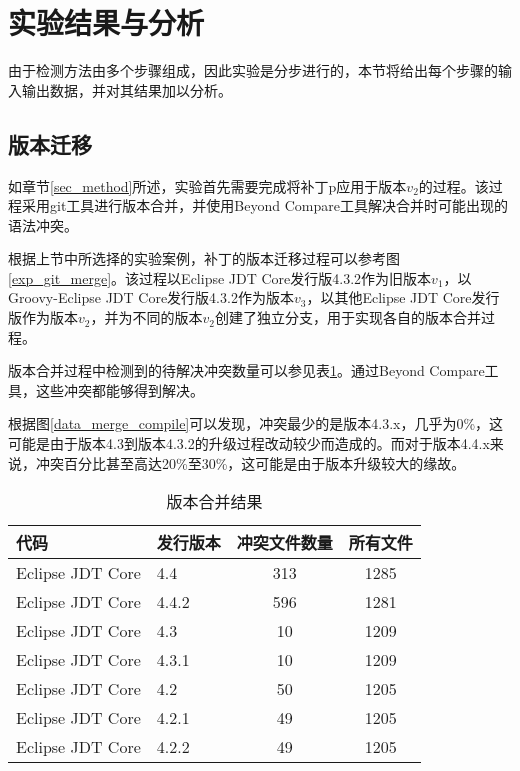 \section{实验结果与分析}
\label {exp_result}

由于检测方法由多个步骤组成，因此实验是分步进行的，本节将给出每个步骤的输入输出数据，并对其结果加以分析。

\subsection{版本迁移}

如章节\ref {sec_method}所述，实验首先需要完成将补丁p应用于版本$v_2$的过程。该过程采用git工具进行版本合并，并使用Beyond Compare工具解决合并时可能出现的语法冲突。

根据上节中所选择的实验案例，补丁的版本迁移过程可以参考图\ref {exp_git_merge}。该过程以Eclipse JDT Core发行版4.3.2作为旧版本$v_1$，以Groovy-Eclipse JDT Core发行版4.3.2作为版本$v_3$，以其他Eclipse JDT Core发行版作为版本$v_2$，并为不同的版本$v_2$创建了独立分支，用于实现各自的版本合并过程。

版本合并过程中检测到的待解决冲突数量可以参见表\ref {data_git_merge}。通过Beyond Compare工具，这些冲突都能够得到解决。

根据图\ref {data_merge_compile}可以发现，冲突最少的是版本4.3.x，几乎为0\%，这可能是由于版本4.3到版本4.3.2的升级过程改动较少而造成的。而对于版本4.4.x来说，冲突百分比甚至高达20\%至30\%，这可能是由于版本升级较大的缘故。




\begin{table}[H]
	\caption{版本合并结果}
	\label{data_git_merge}
	\centering
	\begin{tabular}{llcc}
		\toprule[1.5pt]
		{\heiti 代码} & {\heiti 发行版本} & {\heiti 冲突文件数量} & {\heiti 所有文件}\\\midrule[1pt]
		Eclipse JDT Core & 4.4 & 313 & 1285\\
		Eclipse JDT Core & 4.4.2 & 596 & 1281\\
		Eclipse JDT Core & 4.3 & 10 & 1209\\
		Eclipse JDT Core & 4.3.1 & 10 & 1209\\
		Eclipse JDT Core & 4.2 & 50 & 1205\\
		Eclipse JDT Core & 4.2.1 & 49 & 1205\\
		Eclipse JDT Core & 4.2.2 & 49 & 1205\\
		\bottomrule[1.5pt]
	\end{tabular}
\end{table}

